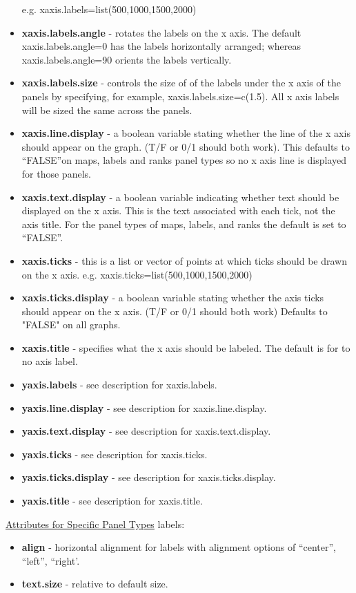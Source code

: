 \documentclass{article}
\begin{document}
\begin{itemize}
e.g. xaxis.labels=list(500,1000,1500,2000)
\item \textbf{xaxis.labels.angle} - rotates the labels on the x axis. The default xaxis.labels.angle=0 has the labels horizontally arranged; whereas xaxis.labels.angle=90 orients the labels vertically.
\item  \textbf{xaxis.labels.size} - controls the size of of the labels under the x axis of the panels by specifying, for example, xaxis.labels.size=c(1.5).  All x axis labels will be sized the same across the panels.
\item  \textbf{xaxis.line.display} - a boolean variable stating whether the line of the x axis should appear on the graph. (T/F or 0/1
should both work). This defaults to ``FALSE''on maps, labels and ranks panel types so no x axis line is displayed for those panels.
\item  \textbf{xaxis.text.display} - a boolean variable indicating whether text should be displayed on the x axis.  This is the text associated with each tick, not the axis title.  For the panel types of maps, labels, and ranks the default is set to ``FALSE''.
\item  \textbf{xaxis.ticks} - this is a list or vector of points at which ticks should be drawn on the x axis.
e.g. xaxis.ticks=list(500,1000,1500,2000)
\item  \textbf{xaxis.ticks.display} - a boolean variable stating whether the axis ticks should appear on the x axis. (T/F or 0/1 should both work) Defaults to "FALSE" on all graphs.
\item  \textbf{xaxis.title} - specifies what the x axis should be labeled. The default is for to no axis label.
\item  \textbf{yaxis.labels} - see description for xaxis.labels.
\item  \textbf{yaxis.line.display} - see description for xaxis.line.display.
\item  \textbf{yaxis.text.display} - see description for xaxis.text.display.
\item  \textbf{yaxis.ticks} - see description for xaxis.ticks.
\item  \textbf{yaxis.ticks.display} - see description for xaxis.ticks.display.
\item  \textbf{yaxis.title} - see description for xaxis.title.
\end{itemize}
\underline{Attributes for Specific Panel Types}
labels:
\begin{itemize}
\item \textbf{align} - horizontal alignment  for labels with alignment options of ``center'', ``left'', ``right'.
\item \textbf{text.size} - relative to default size.
\end{itemize}
\end{document}
